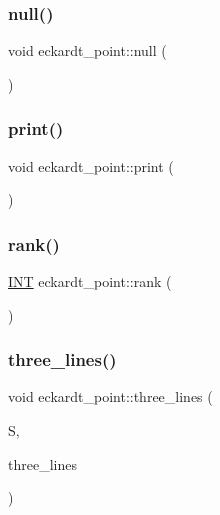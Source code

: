 \subsubsection{\texorpdfstring{null()}{null()}}
{\footnotesize\ttfamily void eckardt\+\_\+point\+::null (\begin{DoxyParamCaption}{ }\end{DoxyParamCaption})}

\mbox{\label{classeckardt__point_aeb291944e3d18d5ce113c54426f62ba0}} 
\subsubsection{\texorpdfstring{print()}{print()}}
{\footnotesize\ttfamily void eckardt\+\_\+point\+::print (\begin{DoxyParamCaption}{ }\end{DoxyParamCaption})}

\mbox{\label{classeckardt__point_a8b195ee81c51b60b7a6ef5e69aab1d8d}} 
\subsubsection{\texorpdfstring{rank()}{rank()}}
{\footnotesize\ttfamily \mbox{\hyperlink{galois_8h_a09fddde158a3a20bd2dcadb609de11dc}{I\+NT}} eckardt\+\_\+point\+::rank (\begin{DoxyParamCaption}{ }\end{DoxyParamCaption})}

\mbox{\label{classeckardt__point_a09d0d5e2bdd6f834aecb6a065c7b6ee7}} 
\subsubsection{\texorpdfstring{three\+\_\+lines()}{three\_lines()}}
{\footnotesize\ttfamily void eckardt\+\_\+point\+::three\+\_\+lines (\begin{DoxyParamCaption}\item[{\mbox{\hyperlink{classsurface}{surface}} $\ast$}]{S,  }\item[{\mbox{\hyperlink{galois_8h_a09fddde158a3a20bd2dcadb609de11dc}{I\+NT}} $\ast$}]{three\+\_\+lines }\end{DoxyParamCaption})}

